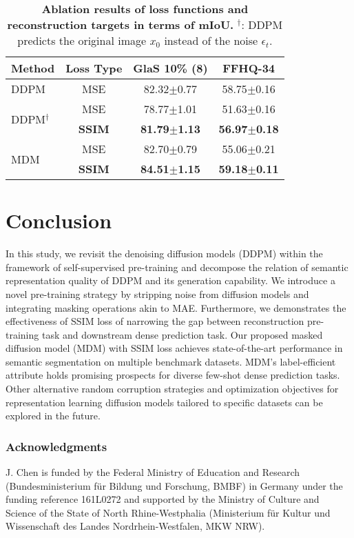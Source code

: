 \documentclass{article} \usepackage{iclr2024_conference,times}
\begin{document}
\begin{table}[!htp]
    \centering
    \caption{\textbf{Ablation results of loss functions and reconstruction targets in terms of mIoU.} $^\dag$: DDPM predicts the original image $x_0$ instead of the noise $\epsilon_t$.}
    \small \begin{tabular}{lccc}
        \toprule
         Method &Loss Type &GlaS 10\% (8) &FFHQ-34\\
        \midrule
        DDPM       &MSE &82.32$\pm$0.77 &58.75$\pm$0.16\\
        \midrule
        \multirow{2}{*}{DDPM$^\dag$}       &MSE &78.77$\pm$1.01 &51.63$\pm$0.16\\
        &\textbf{SSIM} &\textbf{81.79$\pm$1.13} &\textbf{56.97$\pm$0.18}\\
        \midrule
        \multirow{2}{*}{MDM}       &MSE &82.70$\pm$0.79 &55.06$\pm$0.21\\
        &\textbf{SSIM} &\textbf{84.51$\pm$1.15} &\textbf{59.18$\pm$0.11}\\
        \bottomrule
    \end{tabular}
    \label{SSIM}
\end{table}



\section{Conclusion}
In this study, we revisit the denoising diffusion models (DDPM) within the framework of self-supervised pre-training and decompose the relation of semantic representation quality of DDPM and its generation capability. We introduce a novel pre-training strategy by stripping noise from diffusion models and integrating masking operations akin to MAE. Furthermore, we demonstrates the effectiveness of SSIM loss of narrowing the gap between reconstruction pre-training task and downstream dense prediction task. Our proposed masked diffusion model (MDM) with SSIM loss achieves state-of-the-art performance in semantic segmentation on multiple benchmark datasets. MDM's label-efficient attribute holds promising prospects for diverse few-shot dense prediction tasks. Other alternative random corruption strategies and optimization objectives for representation learning diffusion models tailored to specific datasets can be explored in the future.

\subsubsection*{Acknowledgments}
J. Chen is funded by the Federal Ministry of Education and Research (Bundesministerium für
Bildung und Forschung, BMBF) in Germany under the funding reference 161L0272 and supported by
the Ministry of Culture and Science of the State of North Rhine-Westphalia (Ministerium für Kultur
und Wissenschaft des Landes Nordrhein-Westfalen, MKW NRW).
\end{document}
